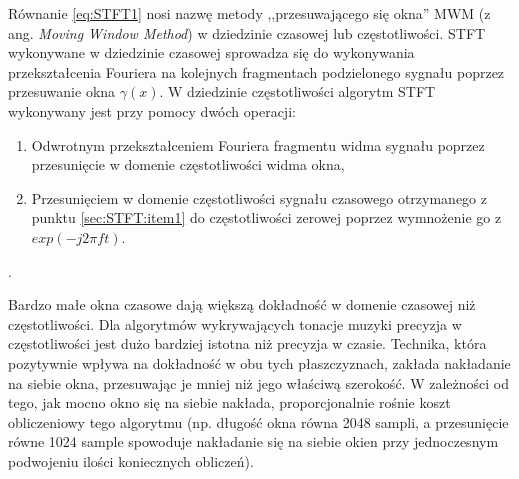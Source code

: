 \documentclass[12pt,a4paper,twoside]{mwart}
\begin{document}
Równanie \ref{eq:STFT1} nosi nazwę metody ,,przesuwającego się okna'' MWM (z ang. \textit{Moving Window Method}) w dziedzinie czasowej lub częstotliwości. STFT wykonywane w dziedzinie czasowej sprowadza się do wykonywania przekształcenia Fouriera na kolejnych fragmentach podzielonego sygnału poprzez przesuwanie okna $\gamma(x)$. W dziedzinie częstotliwości algorytm STFT wykonywany jest przy pomocy dwóch operacji:
\begin{enumerate}
  \item \label{sec:STFT:item1}Odwrotnym przekształceniem Fouriera fragmentu widma sygnału poprzez przesunięcie w domenie częstotliwości widma okna,
  \item Przesunięciem w domenie częstotliwości sygnału czasowego otrzymanego z punktu \ref{sec:STFT:item1} do częstotliwości zerowej poprzez wymnożenie go z $exp(-j2 \pi ft)$.
\end{enumerate}
\cite[455-458]{CyfrowePrzetwarzanieSygnalowOdTeoriiDoZastosowan}.

Bardzo małe okna czasowe dają większą dokładność w domenie czasowej niż częstotliwości. Dla algorytmów wykrywających tonacje muzyki precyzja w częstotliwości jest dużo bardziej istotna niż precyzja w czasie. Technika, która pozytywnie wpływa na dokładność w obu tych płaszczyznach, zakłada nakładanie na siebie okna, przesuwając je mniej niż jego właściwą szerokość. W zależności od tego, jak mocno okno się na siebie nakłada, proporcjonalnie rośnie koszt obliczeniowy tego algorytmu (np. długość okna równa 2048 sampli, a przesunięcie równe 1024 sample spowoduje nakładanie się na siebie okien przy jednoczesnym podwojeniu ilości koniecznych obliczeń). 
\end{document}
